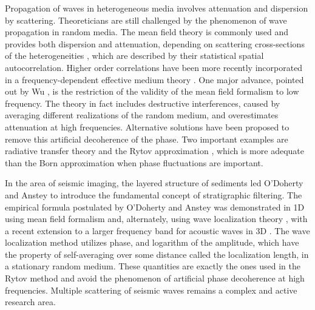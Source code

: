Propagation of waves in heterogeneous media involves attenuation and dispersion by scattering.
Theoreticians are still challenged by the phenomenon of wave propagation in 
random media. The mean field theory \cite[]{Chernov_60,Karal_K64,Uscinski_77}
is commonly used and provides both dispersion and attenuation,
depending on scattering cross-sections of the heterogeneities \cite[]{Waterman_T61,Wu_A85,Kanaun_L08},
which are described by their statistical spatial autocorrelation.
Higher order correlations have been more recently incorporated 
in a frequency-dependent effective medium theory \cite[]{Chesnokov_KK98}.
One major advance, pointed out by Wu 
, is the restriction of the validity of the mean field formalism to low frequency.
The theory in fact includes destructive interferences, 
caused by averaging different realizations of the random medium,
and overestimates attenuation at high frequencies.
Alternative solutions have been proposed to remove this artificial decoherence of the phase.
Two important examples are radiative transfer theory \cite[]{Wu_93,Haney_WS05}
and the Rytov approximation \cite[]{Rytov_KT89}, which is more adequate than 
the Born approximation when phase fluctuations are important.

In the area of seismic imaging, the layered structure of sediments led
O'Doherty and Anstey  to introduce the fundamental concept
of stratigraphic filtering. 
The empirical formula postulated by O'Doherty and Anstey was demonstrated in 1D 
using mean field formalism \cite[]{Banik_LS85,Resnick_90}
and, alternately, using wave localization theory
\cite[]{Sheng_WZP86,Shapiro_Z93,Shapiro_H99},
with a recent extension to a larger frequency band
for acoustic waves in 3D \cite[]{Muller_S01}.
The wave localization method utilizes phase, and logarithm of the amplitude,
which have the property of self-averaging over some distance called the localization length,
in a stationary random medium.
These quantities are exactly the ones used in the Rytov method
and avoid the phenomenon of artificial phase decoherence at high frequencies.
Multiple scattering of seismic waves remains a complex and active research area. 

